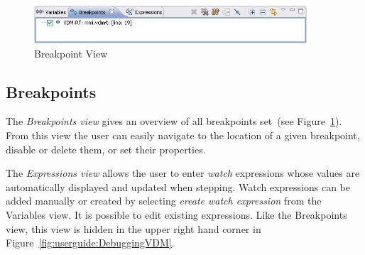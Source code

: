 \begin{figure}[htp]
\begin{center}
  \includegraphics[width=4in]{figures/BreakpointViewRT}
  \caption{Breakpoint View}
  \label{fig:userguide:BreakpointView}
\end{center}
\end{figure}

\subsection{Breakpoints}

The \emph{Breakpoints view} gives an overview of all breakpoints
set~(see Figure~\ref{fig:userguide:BreakpointView}). From this view
the user can easily navigate to the location of a given breakpoint,
disable or delete them, or set their properties.
 



The \emph{Expressions view} allows the user to enter \emph{watch}
expressions whose values are automatically displayed and updated when
stepping. Watch expressions can be added manually or created by
selecting \emph{create watch expression} from the Variables view. It
is possible to edit existing expressions.  Like the Breakpoints view,
this view is hidden in the upper right hand corner in
Figure~\ref{fig:userguide:DebuggingVDM}.

